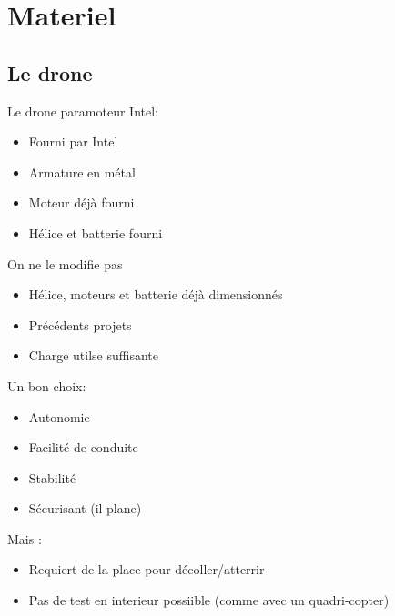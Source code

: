 \documentclass[transparent]{beamer}
\begin{document}
\section{Materiel}
\subsection{Le drone}

\begin{frame}
	\begin{block}{Le drone paramoteur Intel:}
			\begin{itemize}
				\item Fourni par Intel
				\item Armature en métal
				\item Moteur déjà fourni
				\item Hélice et batterie fourni
			\end{itemize}
	\end{block}
	\begin{block}{On ne le modifie pas}
			\begin{itemize}
				\item Hélice, moteurs et batterie déjà dimensionnés
				\item Précédents projets
				\item Charge utilse suffisante
			\end{itemize}
	\end{block}
\end{frame}

\begin{frame}
	\begin{block}{Un bon choix:}
			\begin{itemize}
				\item Autonomie
				\item Facilité de conduite
				\item Stabilité
				\item Sécurisant (il plane)
			\end{itemize}
	\end{block}
	\begin{block}{Mais :}
			\begin{itemize}
				\item Requiert de la place pour décoller/atterrir
				\item Pas de test en interieur possiible (comme avec un quadri-copter)
			\end{itemize}
	\end{block}
\end{frame}
\end{document}
